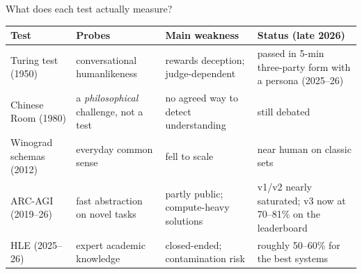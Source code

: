 \begin{frame}{What does each test actually measure?}
\small
{}\begin{tabularx}{\linewidth}{@{}p{2.6cm}YYY@{}}
\toprule
\textbf{Test} & \textbf{Probes} & \textbf{Main weakness} & \textbf{Status (late 2026)}\\
\midrule
Turing test (1950) & conversational humanlikeness & rewards deception; judge-dependent & passed in 5-min three-party form with a persona (2025--26)\\[2pt]
Chinese Room (1980) & a \emph{philosophical} challenge, not a test & no agreed way to detect understanding & still debated\\[2pt]
Winograd schemas (2012) & everyday common sense & fell to scale & near human on classic sets\\[2pt]
ARC-AGI (2019--26) & fast abstraction on novel tasks & partly public; compute-heavy solutions & v1/v2 nearly saturated; v3 now at 70--81\% on the leaderboard\\[2pt]
HLE (2025--26) & expert academic knowledge & closed-ended; contamination risk & roughly 50--60\% for the best systems\\
\bottomrule
\end{tabularx}
\end{frame}
